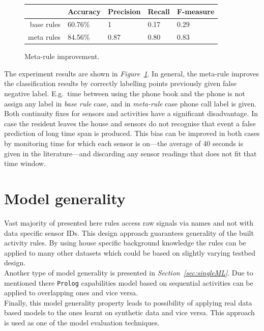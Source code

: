 \documentclass[10pt, a4paper, pdflatex, leqno, twoside, openright]{report}
\begin{document}
\begin{figure}[htb]
  \centering
  \begin{tabular}{ r | l l l l }
 & Accuracy & Precision & Recall & F-measure\\
\hline
base rules & 60.76\% & 1 & 0.17 & 0.29\\
meta rules & 84.56\% & 0.87 & 0.80 & 0.83 \\
  \end{tabular}
  \caption{Meta-rule improvement.\label{tab:metaImprovement}}
\end{figure}

The experiment results are shown in \emph{Figure~\ref{tab:metaImprovement}}. In general, the meta-rule improves the classification results by correctly labelling points previously given false negative label. E.g.\ time between using the phone book and the phone is not assign any label in \emph{base rule} case, and in \emph{meta-rule} case phone call label is given.\\

Both continuity fixes for sensors and activities have a significant disadvantage. In case the resident leaves the house and sensors do not recognise that event a false prediction of long time span is produced. This bias can be improved in both cases by monitoring time for which each sensor is on---the average of 40 seconds is given in the literature---and discarding any sensor readings that does not fit that time window.

  \section{Model generality}
Vast majority of presented here rules access raw signals via names and not with data specific sensor IDs. This design approach guarantees generality of the built activity rules. By using house specific background knowledge the rules can be applied to many other datasets which could be based on slightly varying testbed design.\\
Another type of model generality is presented in \emph{Section~\ref{sec:singleML}}. Due to mentioned there \texttt{Prolog} capabilities model based on sequential activities can be applied to overlapping ones and vice versa.\\

Finally, this model generality property leads to possibility of applying real data based models to the ones learnt on synthetic data and vice versa. This approach is used as one of the model evaluation techniques.
\end{document}
